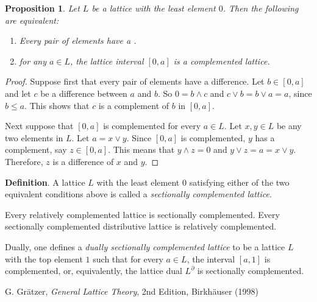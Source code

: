 \documentclass[12pt]{article}
\newtheorem{prop}{Proposition}
\begin{document}
\begin{prop} Let $L$ be a lattice with the least element $0$.  Then the following are equivalent:
\begin{enumerate}
\item Every pair of elements have a .
\item for any $a\in L$, the lattice interval $[0,a]$ is a complemented lattice.
\end{enumerate}
\end{prop}
\begin{proof}
Suppose first that every pair of elements have a difference.  Let $b\in [0,a]$ and let $c$ be a difference between $a$ and $b$.  So $0=b\wedge c$ and $c\vee b=b\vee a=a$, since $b\le a$.  This shows that $c$ is a complement of $b$ in $[0,a]$.

Next suppose that $[0,a]$ is complemented for every $a\in L$.  Let $x,y\in L$ be any two elements in $L$.  Let $a=x\vee y$.  Since $[0,a]$ is complemented, $y$ has a complement, say $z\in [0,a]$.  This means that $y\wedge z=0$ and $y\vee z=a= x\vee y$.  Therefore, $z$ is a difference of $x$ and $y$.
\end{proof}

\textbf{Definition}.  A lattice $L$ with the least element $0$ satisfying either of the two equivalent conditions above is called a \emph{sectionally complemented lattice}.

Every relatively complemented lattice is sectionally complemented.  Every sectionally complemented distributive lattice is relatively complemented.

Dually, one defines a \emph{dually sectionally complemented lattice} to be a lattice $L$ with the top element $1$ such that for every $a\in L$, the interval $[a,1]$ is complemented, or, equivalently, the lattice dual $L^{\partial}$ is sectionally complemented.

\begin{thebibliography}{6}
 G. Gr\"atzer, {\it General Lattice Theory}, 2nd Edition, Birkh\"auser (1998)
\end{thebibliography}
\end{document}
